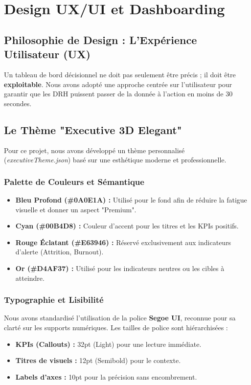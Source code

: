 \chapter{Design UX/UI et Dashboarding}

\section{Philosophie de Design : L'Expérience Utilisateur (UX)}

Un tableau de bord décisionnel ne doit pas seulement être précis ; il doit être \textbf{exploitable}. Nous avons adopté une approche centrée sur l'utilisateur pour garantir que les DRH puissent passer de la donnée à l'action en moins de 30 secondes.

\section{Le Thème "Executive 3D Elegant"}

Pour ce projet, nous avons développé un thème personnalisé (\textit{executiveTheme.json}) basé sur une esthétique moderne et professionnelle.

\subsection{Palette de Couleurs et Sémantique}
\begin{itemize}
    \item \textbf{Bleu Profond (\#0A0E1A) :} Utilisé pour le fond afin de réduire la fatigue visuelle et donner un aspect "Premium".
    \item \textbf{Cyan (\#00B4D8) :} Couleur d'accent pour les titres et les KPIs positifs.
    \item \textbf{Rouge Éclatant (\#E63946) :} Réservé exclusivement aux indicateurs d'alerte (Attrition, Burnout).
    \item \textbf{Or (\#D4AF37) :} Utilisé pour les indicateurs neutres ou les cibles à atteindre.
\end{itemize}

\subsection{Typographie et Lisibilité}
Nous avons standardisé l'utilisation de la police \textbf{Segoe UI}, reconnue pour sa clarté sur les supports numériques. Les tailles de police sont hiérarchisées :
\begin{itemize}
    \item \textbf{KPIs (Callouts) :} 32pt (Light) pour une lecture immédiate.
    \item \textbf{Titres de visuels :} 12pt (Semibold) pour le contexte.
    \item \textbf{Labels d'axes :} 10pt pour la précision sans encombrement.
\end{itemize}

